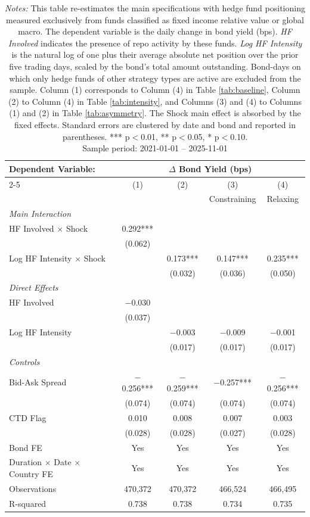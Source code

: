 \documentclass[english, 11pt, oneside]{article}
\begin{document}
\begin{table}[h!]
\centering
\caption{\textbf{Positioning from Fixed Income and Macro Funds Only}}
\footnotesize
\setlength{\tabcolsep}{8pt}
\renewcommand{\arraystretch}{1.1}
\begin{tabular}{l c c c c}
\toprule
\textbf{Dependent Variable:} & \multicolumn{4}{c}{\textbf{$\Delta$ Bond Yield (bps)}} \\
\cmidrule(lr){2-5}
 & (1) & (2) & (3) & (4) \\
 & & & Constraining & Relaxing \\
\midrule
\textit{Main Interaction} & & & & \\
HF Involved $\times$ Shock & 0.292*** & & & \\
 & (0.062) & & & \\
Log HF Intensity $\times$ Shock & & 0.173*** & 0.147*** & 0.235*** \\
 & & (0.032) & (0.036) & (0.050) \\
\addlinespace
\textit{Direct Effects} & & & & \\
HF Involved & $-$0.030 & & & \\
 & (0.037) & & & \\
Log HF Intensity & & $-$0.003 & $-$0.009 & $-$0.001 \\
 & & (0.017) & (0.017) & (0.017) \\
\addlinespace
\textit{Controls} & & & & \\
Bid-Ask Spread & $-$0.256*** & $-$0.259*** & $-$0.257*** & $-$0.256*** \\
 & (0.074) & (0.074) & (0.074) & (0.074) \\
CTD Flag & 0.010 & 0.008 & 0.007 & 0.003 \\
 & (0.028) & (0.028) & (0.027) & (0.028) \\
\midrule
Bond FE & Yes & Yes & Yes & Yes \\
Duration $\times$ Date $\times$ Country FE & Yes & Yes & Yes & Yes \\
\midrule
Observations & 470,372 & 470,372 & 466,524 & 466,495 \\
R-squared & 0.738 & 0.738 & 0.734 & 0.735 \\
\bottomrule
\end{tabular}
\label{tab:fimacro}
\caption*{\textit{Notes:} This table re-estimates the main specifications with hedge fund positioning measured exclusively from funds classified as fixed income relative value or global macro. The dependent variable is the daily change in bond yield (bps). \textit{HF Involved} indicates the presence of repo activity by these funds. \textit{Log HF Intensity} is the natural log of one plus their average absolute net position over the prior five trading days, scaled by the bond's total amount outstanding. Bond-days on which only hedge funds of other strategy types are active are excluded from the sample. Column (1) corresponds to Column (4) in Table \ref{tab:baseline}, Column (2) to Column (4) in Table \ref{tab:intensity}, and Columns (3) and (4) to Columns (1) and (2) in Table \ref{tab:asymmetry}. The Shock main effect is absorbed by the fixed effects. Standard errors are clustered by date and bond and reported in parentheses. *** p$<$0.01, ** p$<$0.05, * p$<$0.10. \\ Sample period: 2021-01-01 -- 2025-11-01}

\end{table}
\end{document}
